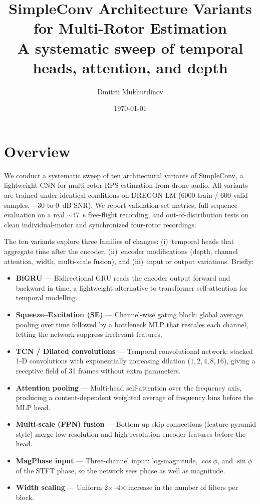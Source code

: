 \documentclass[11pt,a4paper]{article}
\title{\textbf{SimpleConv Architecture Variants for Multi-Rotor \rps{} Estimation}\\
  \large A systematic sweep of temporal heads, attention, and depth}
\author{Dmitrii Mukhutdinov}
\date{\today}
\newcommand{\rps}{\ensuremath{\mathrm{RPS}}}
\begin{document}
\maketitle

\section{Overview}

We conduct a systematic sweep of ten architectural variants of SimpleConv, a lightweight CNN for multi-rotor \rps{} estimation from drone audio. All variants are trained under identical conditions on DREGON-LM (6000 train / 600 valid samples, $-30$ to $0$~dB SNR). We report validation-set metrics, full-sequence evaluation on a real $\sim$47~s free-flight recording, and out-of-distribution tests on clean individual-motor and synchronized four-rotor recordings.

The ten variants explore three families of changes: (i)~temporal heads that aggregate time after the encoder, (ii)~encoder modifications (depth, channel attention, width, multi-scale fusion), and (iii)~input or output variations.  Briefly:
\begin{itemize}
  \item \textbf{BiGRU} — Bidirectional GRU reads the encoder output forward and backward in time; a lightweight alternative to transformer self-attention for temporal modelling.
  \item \textbf{Squeeze--Excitation (SE)} — Channel-wise gating block: global average pooling over time followed by a bottleneck MLP that rescales each channel, letting the network suppress irrelevant features.
  \item \textbf{TCN / Dilated convolutions} — Temporal convolutional network: stacked 1-D convolutions with exponentially increasing dilation ($1,2,4,8,16$), giving a receptive field of 31 frames without extra parameters.
  \item \textbf{Attention pooling} — Multi-head self-attention over the frequency axis, producing a content-dependent weighted average of frequency bins before the MLP head.
  \item \textbf{Multi-scale (FPN) fusion} — Bottom-up skip connections (feature-pyramid style) merge low-resolution and high-resolution encoder features before the head.
  \item \textbf{MagPhase input} — Three-channel input: log-magnitude, $\cos\phi$, and $\sin\phi$ of the STFT phase, so the network sees phase as well as magnitude.
  \item \textbf{Width scaling} — Uniform 2$\times$--4$\times$ increase in the number of filters per block.
\end{itemize}
\end{document}
